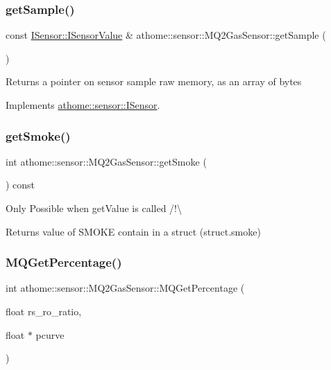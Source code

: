\subsubsection{\texorpdfstring{get\+Sample()}{getSample()}}
{\footnotesize\ttfamily const \mbox{\hyperlink{structathome_1_1sensor_1_1_i_sensor_1_1_i_sensor_value}{I\+Sensor\+::\+I\+Sensor\+Value}} \& athome\+::sensor\+::\+M\+Q2\+Gas\+Sensor\+::get\+Sample (\begin{DoxyParamCaption}{ }\end{DoxyParamCaption})\hspace{0.3cm}{\ttfamily [virtual]}}

Returns a pointer on sensor sample raw memory, as an array of bytes 

Implements \mbox{\hyperlink{classathome_1_1sensor_1_1_i_sensor_ae109cd3741ea9c88dc7e4f2eaf1485d5}{athome\+::sensor\+::\+I\+Sensor}}.

\mbox{\label{classathome_1_1sensor_1_1_m_q2_gas_sensor_aa6e3ad7d0382f04cf15388fd36722579}} 
\subsubsection{\texorpdfstring{get\+Smoke()}{getSmoke()}}
{\footnotesize\ttfamily int athome\+::sensor\+::\+M\+Q2\+Gas\+Sensor\+::get\+Smoke (\begin{DoxyParamCaption}{ }\end{DoxyParamCaption}) const}

Only Possible when get\+Value is called /!\textbackslash{}

\begin{DoxyReturn}{Returns}
value of S\+M\+O\+KE contain in a struct (struct.\+smoke) 
\end{DoxyReturn}
\mbox{\label{classathome_1_1sensor_1_1_m_q2_gas_sensor_a6bf60231a95fe2ba2f5bc9c1bad714c5}} 
\subsubsection{\texorpdfstring{M\+Q\+Get\+Percentage()}{MQGetPercentage()}}
{\footnotesize\ttfamily int athome\+::sensor\+::\+M\+Q2\+Gas\+Sensor\+::\+M\+Q\+Get\+Percentage (\begin{DoxyParamCaption}\item[{float}]{rs\+\_\+ro\+\_\+ratio,  }\item[{float $\ast$}]{pcurve }\end{DoxyParamCaption})}

